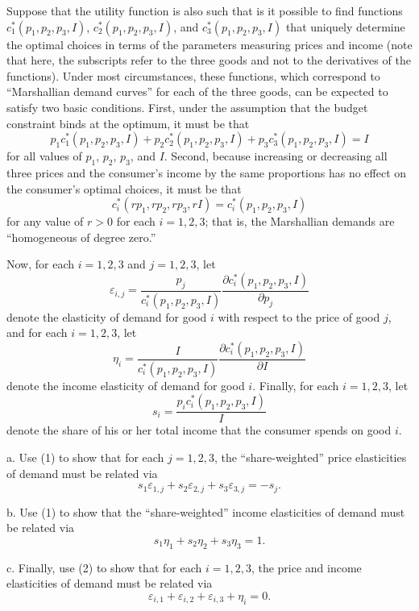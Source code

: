 \documentclass[12pt]{article}
\begin{document}
Suppose that the utility function is also such that is it possible to find functions $c_{1}^{*}(p_{1},p_{2},p_{3},I)$, $c_{2}^{*}(p_{1},p_{2},p_{3},I)$, and $c_{3}^{*}(p_{1},p_{2},p_{3},I)$ that uniquely determine the optimal choices in terms of the parameters measuring prices and income (note that here, the subscripts refer to the three goods and not to the derivatives of the functions). Under most circumstances, these functions, which correspond to ``Marshallian demand curves'' for each of the three goods, can be expected to satisfy two basic conditions. First, under the assumption that the budget constraint binds at the optimum, it must be that
\begin{equation}
p_{1}c_{1}^{*}(p_{1},p_{2},p_{3},I) + p_{2}c_{2}^{*}(p_{1},p_{2},p_{3},I) + p_{3}c_{3}^{*}(p_{1},p_{2},p_{3},I) = I \tag{1}
\end{equation}
for all values of $p_{1}$, $p_{2}$, $p_{3}$, and $I$. Second, because increasing or decreasing all three prices and the consumer's income by the same proportions has no effect on the consumer's optimal choices, it must be that
\begin{equation}
c_{i}^{*}(rp_{1},rp_{2},rp_{3},rI) = c_{i}^{*}(p_{1},p_{2},p_{3},I) \tag{2}
\end{equation}
for any value of $r>0$ for each $i=1,2,3$; that is, the Marshallian demands are ``homogeneous of degree zero.''

Now, for each $i=1,2,3$ and $j=1,2,3$, let
$$
\varepsilon_{i,j} = \frac{p_{j}}{c_{i}^{*}(p_{1},p_{2},p_{3},I)} \frac{\partial c_{i}^{*}(p_{1},p_{2},p_{3},I)}{\partial p_{j}}
$$
denote the elasticity of demand for good $i$ with respect to the price of good $j$, and for each $i=1,2,3$, let
$$
\eta_{i} = \frac{I}{c_{i}^{*}(p_{1},p_{2},p_{3},I)} \frac{\partial c_{i}^{*}(p_{1},p_{2},p_{3},I)}{\partial I}
$$
denote the income elasticity of demand for good $i$. Finally, for each $i=1,2,3$, let
$$
s_{i} = \frac{p_{i}c_{i}^{*}(p_{1},p_{2},p_{3},I)}{I}
$$
denote the share of his or her total income that the consumer spends on good $i$.
\begin{description}
\item a. Use (1) to show that for each $j=1,2,3$, the ``share-weighted'' price elasticities of demand must be related via
$$
s_{1}\varepsilon_{1,j} + s_{2}\varepsilon_{2,j} + s_{3}\varepsilon_{3,j} = -s_{j}.
$$
\item b. Use (1) to show that the ``share-weighted'' income elasticities of demand must be related via
$$
s_{1}\eta_{1} + s_{2}\eta_{2} + s_{3}\eta_{3} = 1.
$$
\item c. Finally, use (2) to show that for each $i=1,2,3$, the price and income elasticities of demand must be related via
$$
\varepsilon_{i,1} + \varepsilon_{i,2} + \varepsilon_{i,3} + \eta_{i} = 0.
$$
\end{description}
\end{document}
